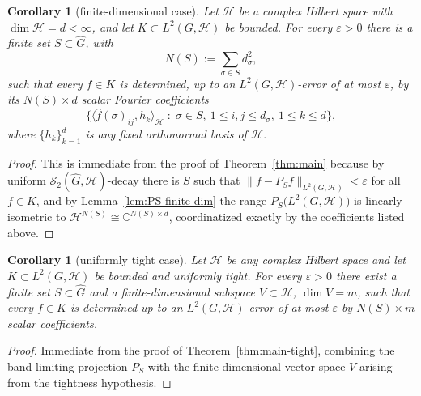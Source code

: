 \documentclass[11pt]{amsart}
\newtheorem{corollary}[theorem]{Corollary}
\begin{document}
\begin{corollary}[finite-dimensional case]
\label{cor:dof-finite}
Let $\mathcal{H}$ be a complex Hilbert space with $\dim \mathcal{H} = d < \infty$, and let
$K\subset L^2(G,\mathcal{H})$ be bounded. For every $\varepsilon>0$ there is a finite
set $S\subset\widehat G$, with
\[
N(S) := \sum_{\sigma\in S} d_\sigma^2,
\]
such that every $f\in K$ is determined, up to an $L^2(G,\mathcal{H})$-error of at most
$\varepsilon$, by its $N(S)\times d$ scalar Fourier coefficients
\[
\big\{\langle \widehat f(\sigma)_{ij}, h_k\rangle_\mathcal{H} \;:\; \sigma\in S,\
1\le i,j\le d_\sigma,\ 1\le k\le d\big\},
\]
where $\{h_k\}_{k=1}^d$ is any fixed orthonormal basis of $\mathcal{H}$.
\end{corollary}

\begin{proof}
This is immediate from the proof of Theorem~\ref{thm:main} because by uniform
$\mathscr{S}_2(\widehat{G},\mathcal{H})$-decay there is $S$ such that
$\|f-P_Sf\|_{L^2(G,\mathcal{H})}<\varepsilon$ for all $f\in K$, and by
Lemma~\ref{lem:PS-finite-dim} the range $P_S\big(L^2(G,\mathcal{H})\big)$ is linearly isometric to
$\mathcal{H}^{N(S)}\cong \mathbb C^{N(S)\times d}$, coordinatized exactly by the coefficients
listed above.
\end{proof}

\begin{corollary}[uniformly tight case]
\label{cor:dof-tight}
Let $\mathcal{H}$ be any complex Hilbert space and let $K\subset L^2(G,\mathcal{H})$ be bounded
and uniformly tight. For every $\varepsilon>0$ there exist a finite set
$S\subset\widehat G$ and a finite-dimensional subspace $V\subset \mathcal{H}$,
$\dim V = m$, such that every $f\in K$ is determined up to an
$L^2(G,\mathcal{H})$-error of at most $\varepsilon$ by $N(S)\times m$ scalar
coefficients.
\end{corollary}

\begin{proof}
Immediate from the proof of Theorem~\ref{thm:main-tight}, combining the band-limiting projection $P_S$
 with the finite-dimensional vector space $V$ arising from the  tightness hypothesis.
\end{proof}
\end{document}
